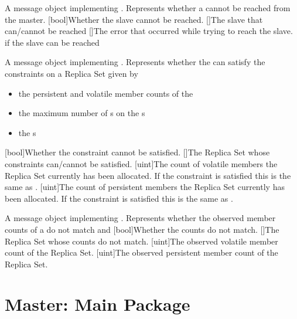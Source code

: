 {
  A message object implementing .
Represents whether a  cannot be reached from the master.
}{
  [bool]{Whether the slave cannot be reached.}
  []{The slave that can/cannot be reached}
  []{The error that occurred while trying to reach the slave.  if the slave can be reached}
}

{
  A message object implementing .
  Represents whether the  can satisfy the constraints on a Replica Set given by
  \begin{itemize}
    \item the persistent and volatile member counts of the 
    \item the maximum number of s on the s
    \item the s
  \end{itemize}
}{
  [bool]{Whether the constraint cannot be satisfied.}
  []{The Replica Set whose constraints can/cannot be satisfied.}
  [uint]{The count of volatile members the Replica Set currently has been allocated. If the constraint is satisfied this is the same as .}
  [uint]{The count of persistent members the Replica Set currently has been allocated. If the constraint is satisfied this is the same as .}
}

{
A message object implementing .
  Represents whether the observed member counts of a  do not match  and 
}{
  [bool]{Whether the counts do not match.}
  []{The Replica Set whose counts do not match.}
  [uint]{The observed volatile member count of the Replica Set.}
  [uint]{The observed persistent member count of the Replica Set.}
}


\section{Master: Main Package}

